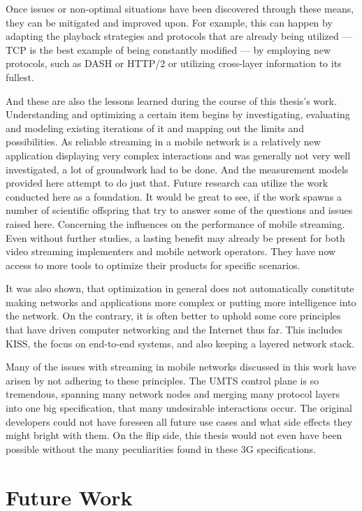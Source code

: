 Once issues or non-optimal situations have been discovered through these means, they can be mitigated and improved upon. For example, this can happen by adapting the playback strategies and protocols that are already being utilized --- \gls{TCP} is the best example of being constantly modified --- by employing new protocols, such as \gls{DASH} or \gls{HTTP}/2 or utilizing cross-layer information to its fullest.

And these are also the lessons learned during the course of this thesis's work. Understanding and optimizing a certain item begins by investigating, evaluating and modeling existing iterations of it and mapping out the limits and possibilities. As reliable streaming in a mobile network is a relatively new application displaying very complex interactions and was generally not very well investigated, a lot of groundwork had to be done. And the measurement models provided here attempt to do just that. Future research can utilize the work conducted here as a foundation. It would be great to see, if the work spawns a number of scientific offspring that try to answer some of the questions and issues raised here. Concerning the influences on the performance of mobile streaming. Even without further studies, a lasting benefit may already be present for both video streaming implementers and mobile network operators. They have now access to more tools to optimize their products for specific scenarios.

It was also shown, that optimization in general does not automatically constitute making networks and applications more complex or putting more intelligence into the network. On the contrary, it is often better to uphold some core principles that have driven computer networking and the Internet thus far. This includes \gls{KISS}, the focus on end-to-end systems, and also keeping a layered network stack. 

Many of the issues with streaming in mobile networks discussed in this work have arisen by not adhering to these principles. The \gls{UMTS} control plane is so tremendous, spanning many network nodes and merging many protocol layers into one big specification, that many undesirable interactions occur. The original developers could not have foreseen all future use cases and what side effects they might bright with them. On the flip side, this thesis would not even have been possible without the many peculiarities found in these \gls{3G} specifications.


\section{Future Work}

